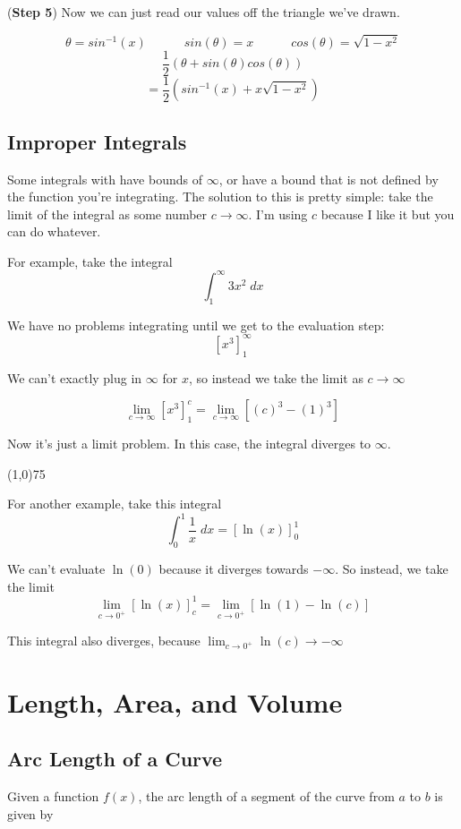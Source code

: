 \documentclass[12pt]{report}
\begin{document}
(\textbf{Step 5}) Now we can just read our values off the triangle we've drawn.

$$ \theta = sin^{-1}(x) \quad \quad \quad sin(\theta) = x \quad \quad \quad cos(\theta) = \sqrt{1-x^2} $$
$$ \frac{1}{2} \left( \theta +  sin(\theta)cos(\theta) \right) $$
$$ = \frac{1}{2} \left( sin^{-1}(x) +  x\sqrt{1-x^2} \right) $$

\clearpage


\section{Improper Integrals}
Some integrals with have bounds of $\infty$, or have a bound that is not defined by the function you're integrating. The solution to this is pretty simple: take the limit of the integral as some number $c\to\infty$. I'm using $c$ because I like it but you can do whatever.

For example, take the integral
$$ \int_1^{\infty} 3x^2 \; dx $$

We have no problems integrating until we get to the evaluation step:
$$ \left[ x^3 \right]_{1}^{\infty} $$

We can't exactly plug in $\infty$ for $x$, so instead we take the limit as $c\to\infty$

$$ \lim_{c\to\infty} \left[ x^3 \right]_{1}^{c} = \lim_{c\to\infty} \left[ (c)^3 - (1)^3 \right] $$

Now it's just a limit problem. In this case, the integral diverges to $\infty$.

\line(1,0){75}

For another example, take this integral
$$ \int_0^1 \frac{1}{x} \; dx = \left[ \ln(x) \right]_0^1 $$

We can't evaluate $\ln(0)$ because it diverges towards $-\infty$. So instead, we take the limit
$$ \lim_{c\to0^+} \left[ \ln(x) \right]_c^1 = \lim_{c\to0^+} \left[ \ln(1) - \ln(c) \right] $$

This integral also diverges, because $\lim_{c\to0^+} \ln(c) \to -\infty$


\clearpage





\chapter{Length, Area, and Volume}

\section{Arc Length of a Curve}
Given a function $f(x)$, the arc length of a segment of the curve from $a$ to $b$ is given by
\end{document}
